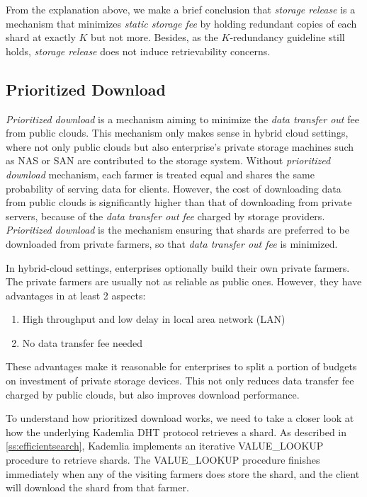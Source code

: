 From the explanation above, we make a brief conclusion that \textit{storage release} is a mechanism that minimizes \textit{static storage fee} by holding redundant copies of each shard at exactly $K$ but not more. Besides, as the $K$-redundancy guideline still holds, \textit{storage release} does not induce retrievability concerns.

\subsection{Prioritized Download}
\label{ss:prioritizeddownload}

\textit{Prioritized download} is a mechanism aiming to minimize the \textit{data transfer out} fee from public clouds. This mechanism only makes sense in hybrid cloud settings, where not only public clouds but also enterprise's private storage machines such as NAS or SAN are contributed to the storage system. Without \textit{prioritized download} mechanism, each farmer is treated equal and shares the same probability of serving data for clients. However, the cost of downloading data from public clouds is significantly higher than that of downloading from private servers, because of the \textit{data transfer out fee} charged by storage providers. \textit{Prioritized download} is the mechanism ensuring that shards are preferred to be downloaded from private farmers, so that \textit{data transfer out fee} is minimized.

In hybrid-cloud settings, enterprises optionally build their own private farmers. The private farmers are usually not as reliable as public ones. However, they have advantages in at least 2 aspects:

\begin{enumerate}
  \item High throughput and low delay in local area network (LAN)
  \item No data transfer fee needed
\end{enumerate}

These advantages make it reasonable for enterprises to split a portion of budgets on investment of private storage devices. This not only reduces data transfer fee charged by public clouds, but also improves download performance.

To understand how prioritized download works, we need to take a closer look at how the underlying Kademlia DHT protocol retrieves a shard. As described in \ref{ss:efficientsearch}, Kademlia implements an iterative VALUE\_LOOKUP procedure to retrieve shards. The VALUE\_LOOKUP procedure finishes immediately when any of the visiting farmers does store the shard, and the client will download the shard from that farmer.

